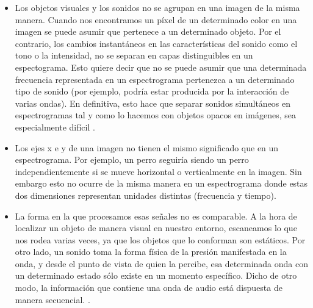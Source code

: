 \documentclass[11pt,a4paper,spanish]{book}
\begin{document}
	\begin{itemize}
		\item Los objetos visuales y los sonidos no se agrupan en una imagen de la misma manera. Cuando nos encontramos un píxel de un determinado color en una imagen se puede asumir que pertenece a un determinado objeto. Por el contrario, los cambios instantáneos en las características del sonido como el tono o la intensidad, no se separan en capas distinguibles en un espectograma. Esto quiere decir que no se puede asumir que una determinada frecuencia representada en un espectrograma pertenezca a un determinado tipo de sonido (por ejemplo, podría estar producida por la interacción de varias ondas). En definitiva, esto hace que separar sonidos simultáneos en espectrogramas tal y como lo hacemos con objetos opacos en imágenes, sea especialmente difícil \cite{Wyse2017}. %
		
		\item Los ejes x e y de una imagen no tienen el mismo significado que en un espectrograma. Por ejemplo, un perro seguiría siendo un perro independientemente si se mueve horizontal o verticalmente en la imagen. Sin embargo esto no ocurre de la misma manera en un espectrograma donde estas dos dimensiones representan unidades distintas (frecuencia y tiempo)\cite{spectrograms2021}.
		
		\item La forma en la que procesamos esas señales no es comparable. A la hora de localizar un objeto de manera visual en nuestro entorno, escaneamos lo que nos rodea varias veces, ya que los objetos que lo conforman son estáticos. 
		Por otro lado, un sonido toma la forma física de la presión manifestada en la onda, y desde el punto de vista de quien la percibe, esa determinada onda con un determinado estado sólo existe en un momento específico. Dicho de otro modo, la información que contiene una onda de audio está dispuesta de manera secuencial.
		\cite{JHui2019}.
		
	\end{itemize} 
	

	
	
	
	
	
	
	
	\printbibliography
	
\end{document}
